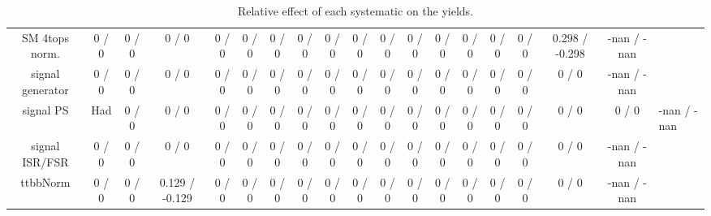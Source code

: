 \documentclass[10pt]{article}
\begin{document}
\begin{table}[htbp]
\begin{center}
\begin{tabular}{|c|c|c|c|c|c|c|c|c|c|c|c|c|c|c|c|c|c|}
  SM 4tops norm. & 0 / 0 & 0 / 0 & 0 / 0 & 0 / 0 & 0 / 0 & 0 / 0 & 0 / 0 & 0 / 0 & 0 / 0 & 0 / 0 & 0 / 0 & 0 / 0 & 0 / 0 & 0 / 0 & 0 / 0 & 0.298 / -0.298 & -nan / -nan \\ 
  signal generator & 0 / 0 & 0 / 0 & 0 / 0 & 0 / 0 & 0 / 0 & 0 / 0 & 0 / 0 & 0 / 0 & 0 / 0 & 0 / 0 & 0 / 0 & 0 / 0 & 0 / 0 & 0 / 0 & 0 / 0 & 0 / 0 & -nan / -nan \\ 
  signal PS & Had & 0 / 0 & 0 / 0 & 0 / 0 & 0 / 0 & 0 / 0 & 0 / 0 & 0 / 0 & 0 / 0 & 0 / 0 & 0 / 0 & 0 / 0 & 0 / 0 & 0 / 0 & 0 / 0 & 0 / 0 & 0 / 0 & -nan / -nan \\ 
  signal ISR/FSR & 0 / 0 & 0 / 0 & 0 / 0 & 0 / 0 & 0 / 0 & 0 / 0 & 0 / 0 & 0 / 0 & 0 / 0 & 0 / 0 & 0 / 0 & 0 / 0 & 0 / 0 & 0 / 0 & 0 / 0 & 0 / 0 & -nan / -nan \\ 
 ttbbNorm & 0 / 0 & 0 / 0 & 0.129 / -0.129 & 0 / 0 & 0 / 0 & 0 / 0 & 0 / 0 & 0 / 0 & 0 / 0 & 0 / 0 & 0 / 0 & 0 / 0 & 0 / 0 & 0 / 0 & 0 / 0 & 0 / 0 & -nan / -nan \\ 
\hline 
\end{tabular} 
\caption{Relative effect of each systematic on the yields.} 
\end{center} 
\end{table} 
\end{document}
